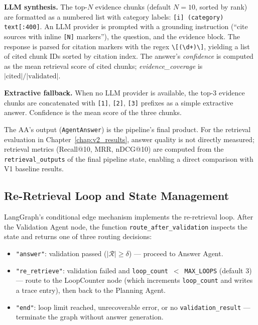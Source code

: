 \textbf{LLM synthesis.} The top-$N$ evidence chunks (default $N = 10$,
sorted by rank) are formatted as a numbered list with category labels:
\texttt{[i] (category) text[:400]}. An LLM provider is prompted with a
grounding instruction (``cite sources with inline \texttt{[N]} markers''),
the question, and the evidence block. The response is parsed for citation
markers with the regex \texttt{\textbackslash[(\textbackslash d+)\textbackslash]},
yielding a list of cited chunk IDs sorted by citation index. The answer's
\textit{confidence} is computed as the mean retrieval score of cited chunks;
\textit{evidence\_coverage} is $|\text{cited}| / |\text{validated}|$.

\textbf{Extractive fallback.} When no LLM provider is available, the top-3
evidence chunks are concatenated with \texttt{[1]}, \texttt{[2]},
\texttt{[3]} prefixes as a simple extractive answer. Confidence is the mean
score of the three chunks.

\medskip
The AA's output (\texttt{AgentAnswer}) is the pipeline's final product. For the
retrieval evaluation in Chapter~\ref{chap:v2_results}, answer quality is not
directly measured; retrieval metrics (Recall@10, MRR, nDCG@10) are computed
from the \texttt{retrieval\_outputs} of the final pipeline state, enabling a
direct comparison with V1 baseline results.


\subsection{Re-Retrieval Loop and State Management}
\label{subsec:v2_loop}

LangGraph's conditional edge mechanism implements the re-retrieval loop.
After the Validation Agent node, the function \texttt{route\_after\_validation}
inspects the state and returns one of three routing decisions:

\begin{itemize}
  \item \texttt{"answer"}: validation passed ($|\mathcal{R}| \geq \delta$) ---
        proceed to Answer Agent.
  \item \texttt{"re\_retrieve"}: validation failed and
        \texttt{loop\_count}~$<$~\texttt{MAX\_LOOPS} (default 3) --- route to
        the LoopCounter node (which increments \texttt{loop\_count} and writes
        a trace entry), then back to the Planning Agent.
  \item \texttt{"end"}: loop limit reached, unrecoverable error, or no
        \texttt{validation\_result} --- terminate the graph without answer
        generation.
\end{itemize}

